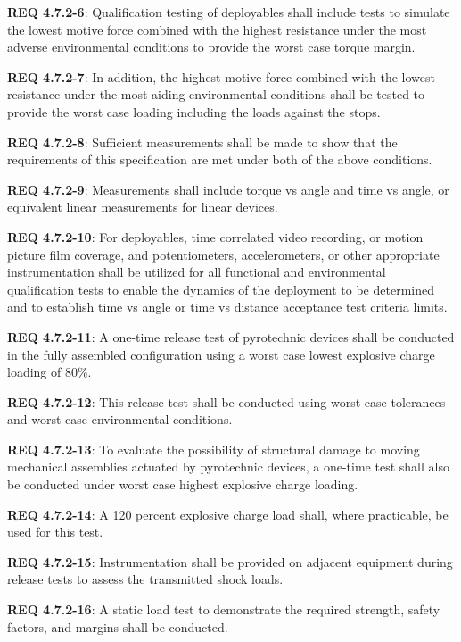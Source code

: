 \documentclass[12pt]{article}
\begin{document}
\noindent \textbf{REQ 4.7.2-6}: Qualification testing of deployables shall include tests to simulate the lowest motive force combined with the highest resistance under the most adverse environmental conditions to provide the worst case torque margin. 

\noindent \textbf{REQ 4.7.2-7}: In addition, the highest motive force combined with the lowest resistance under the most aiding environmental conditions shall be tested to provide the worst case loading including the loads against the stops. 

\noindent \textbf{REQ 4.7.2-8}: Sufficient measurements shall be made to show that the requirements of this specification are met under both of the above conditions. 

\noindent \textbf{REQ 4.7.2-9}: Measurements shall include torque vs angle and time vs angle, or equivalent linear measurements for linear devices. 

\noindent \textbf{REQ 4.7.2-10}: For deployables, time correlated video recording, or motion picture film coverage, and potentiometers, accelerometers, or other appropriate instrumentation shall be utilized for all functional and environmental qualification tests to enable the dynamics of the deployment to be determined and to establish time vs angle or time vs distance acceptance test criteria limits. 

\noindent \textbf{REQ 4.7.2-11}: A one-time release test of pyrotechnic devices shall be conducted in the fully assembled configuration using a worst case lowest explosive charge loading of 80\%. 

\noindent \textbf{REQ 4.7.2-12}: This release test shall be conducted using worst case tolerances and worst case environmental conditions. 

\noindent \textbf{REQ 4.7.2-13}: To evaluate the possibility of structural damage to moving mechanical assemblies actuated by pyrotechnic devices, a one-time test shall also be conducted under worst case highest explosive charge loading. 

\noindent \textbf{REQ 4.7.2-14}: A 120 percent explosive charge load shall, where practicable, be used for this test. 

\noindent \textbf{REQ 4.7.2-15}: Instrumentation shall be provided on adjacent equipment during release tests to assess the transmitted shock loads. 

\noindent \textbf{REQ 4.7.2-16}: A static load test to demonstrate the required strength, safety factors, and margins shall be conducted. 
\end{document}
